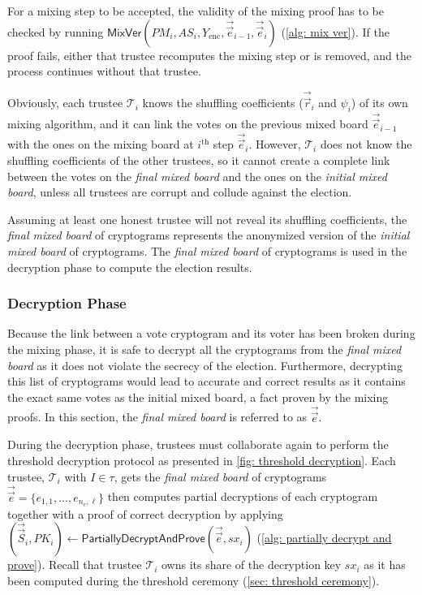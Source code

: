 For a mixing step to be accepted, the validity of the mixing proof has to be checked by running $\mathsf{MixVer}(PM_i, AS_i, Y_\mathrm{enc}, \vec{\vec{e}}_{i-1}, \vec{\vec{e}}_i)$ (\cref{alg: mix ver}). If the proof fails, either that trustee recomputes the mixing step or is removed, and the process continues without that trustee.

Obviously, each trustee $\mathcal{T}_i$ knows the shuffling coefficients ($\vec{\vec{r}}_i$ and $\psi_i$) of its own mixing algorithm, and it can link the votes on the previous mixed board $\vec{\vec{e}}_{i-1}$ with the ones on the mixing board at $i^\mathrm{th}$ step $\vec{\vec{e}}_i$. However, $\mathcal{T}_i$ does not know the shuffling coefficients of the other trustees, so it cannot create a complete link between the votes on the \textit{final mixed board} and the ones on the \textit{initial mixed board}, unless all trustees are corrupt and collude against the election.

Assuming at least one honest trustee will not reveal its shuffling coefficients, the \textit{final mixed board} of cryptograms represents the anonymized version of the \textit{initial mixed board} of cryptograms. The \textit{final mixed board} of cryptograms is used in the decryption phase to compute the election results.


\subsubsection{Decryption Phase} \label{sec: decryption phase}
Because the link between a vote cryptogram and its voter has been broken during the mixing phase, it is safe to decrypt all the cryptograms from the \textit{final mixed board} as it does not violate the secrecy of the election. Furthermore, decrypting this list of cryptograms would lead to accurate and correct results as it contains the exact same votes as the initial mixed board, a fact proven by the mixing proofs. In this section, the \textit{final mixed board} is referred to as $\vec{\vec{e}}$.

During the decryption phase, trustees must collaborate again to perform the threshold decryption protocol as presented in \cref{fig: threshold decryption}. Each trustee, $\mathcal{T}_i$ with $I \in \tau$, gets the \textit{final mixed board} of cryptograms $\vec{\vec{e}} = \{ e_{1, 1}, ..., e_{n_\mathrm{e}, \ell} \}$ then computes partial decryptions of each cryptogram together with a proof of correct decryption by applying $(\vec{\vec{S}}_i, PK_i) \gets \mathsf{PartiallyDecryptAndProve}(\vec{\vec{e}}, sx_i)$ (\cref{alg: partially decrypt and prove}). Recall that trustee $\mathcal{T}_i$ owns its share of the decryption key $sx_i$ as it has been computed during the threshold ceremony (\cref{sec: threshold ceremony}).


